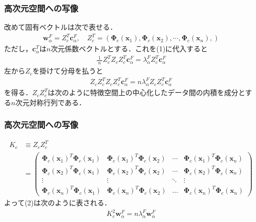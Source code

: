 \documentclass[dvipdfmx,cjk]{beamer}
\theoremstyle{example}
\begin{document}
\begin{frame}
    \frametitle{高次元空間への写像}
    改めて固有ベクトルは次で表せる．
    \begin{align*}
        \boldsymbol{w}_\alpha^F=Z_c^T\boldsymbol{c}_\alpha^F,\quad Z_c^T=\left(\boldsymbol{\Phi}_c(\boldsymbol{x}_1),\boldsymbol{\Phi}_c(\boldsymbol{x}_2),\cdots,\boldsymbol{\Phi}_c(\boldsymbol{x}_n),\right)\tag{3}
    \end{align*}
    ただし，$\boldsymbol{c}_\alpha^T$は$n$次元係数ベクトルとする．これを(1)に代入すると
    \begin{align*}
        \frac{1}{\;n\;}Z_c^TZ_cZ_c^T\boldsymbol{c}_\alpha^F=\lambda_\alpha^FZ_c^T\boldsymbol{c}_\alpha^F
    \end{align*}
    左から$Z_c$を掛けて分母を払うと
    \begin{align*}
        Z_cZ_c^TZ_cZ_c^T\boldsymbol{c}_\alpha^F=n\lambda_\alpha^FZ_cZ_c^T\boldsymbol{c}_\alpha^F\tag{2}
    \end{align*}
    を得る．$Z_cZ_c^T$は次のように特徴空間上の中心化したデータ間の内積を成分とする$n$次元対称行列である．
\end{frame}
\begin{frame}
    \frametitle{高次元空間への写像}
    \begin{align*}
        K_c & \equiv Z_cZ_c^T                                                                                                                                                                                                                                      \\
            & =\begin{pmatrix}
                   \boldsymbol{\Phi}_c(\boldsymbol{x}_1)^T\boldsymbol{\Phi}_c(\boldsymbol{x}_1) & \boldsymbol{\Phi}_c(\boldsymbol{x}_1)^T\boldsymbol{\Phi}_c(\boldsymbol{x}_2) & \cdots & \boldsymbol{\Phi}_c(\boldsymbol{x}_1)^T\boldsymbol{\Phi}_c(\boldsymbol{x}_n) \\
                   \boldsymbol{\Phi}_c(\boldsymbol{x}_2)^T\boldsymbol{\Phi}_c(\boldsymbol{x}_1) & \boldsymbol{\Phi}_c(\boldsymbol{x}_2)^T\boldsymbol{\Phi}_c(\boldsymbol{x}_2) & \cdots & \boldsymbol{\Phi}_c(\boldsymbol{x}_2)^T\boldsymbol{\Phi}_c(\boldsymbol{x}_n) \\
                   \vdots                                                                       & \vdots                                                                       & \ddots & \vdots                                                                       \\
                   \boldsymbol{\Phi}_c(\boldsymbol{x}_n)^T\boldsymbol{\Phi}_c(\boldsymbol{x}_1) & \boldsymbol{\Phi}_c(\boldsymbol{x}_n)^T\boldsymbol{\Phi}_c(\boldsymbol{x}_2) & \dots  & \boldsymbol{\Phi}_c(\boldsymbol{x}_n)^T\boldsymbol{\Phi}_c(\boldsymbol{x}_n)
               \end{pmatrix}
    \end{align*}
    よって(2)は次のように表される．
    \begin{align*}
        K_c^2\boldsymbol{w}_\alpha^F=n\lambda_\alpha^F\boldsymbol{w}_\alpha^F
    \end{align*}
\end{frame}
\end{document}
